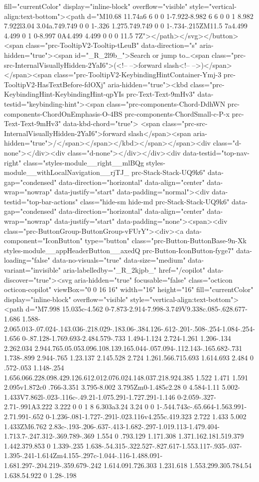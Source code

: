 {{fill="currentColor" display="inline-block" overflow="visible" style="vertical-align:text-bottom"><path d="M10.68 11.74a6 6 0 0 1-7.922-8.982 6 6 0 0 1 8.982 7.922l3.04 3.04a.749.749 0 0 1-.326 1.275.749.749 0 0 1-.734-.215ZM11.5 7a4.499 4.499 0 1 0-8.997 0A4.499 4.499 0 0 0 11.5 7Z"></path></svg></button><span class="prc-TooltipV2-Tooltip-tLeuB" data-direction="s" aria-hidden="true"><span id="_R_2l9b_">Search or jump to…<span class="prc-src-InternalVisuallyHidden-2YaI6">(<!-- -->forward slash<!-- -->)</span></span><span class="prc-TooltipV2-KeybindingHintContainer-Ymj-3 prc-TooltipV2-HasTextBefore-fdOXj" aria-hidden="true"><kbd class="prc-KeybindingHint-KeybindingHint-qpYIs prc-Text-Text-9mHv3" data-testid="keybinding-hint"><span class="prc-components-Chord-DdhWN prc-components-ChordOnEmphasis-O-4BS prc-components-ChordSmall-c-P-x prc-Text-Text-9mHv3" data-kbd-chord="true"> <span class="prc-src-InternalVisuallyHidden-2YaI6">forward slash</span><span aria-hidden="true">/</span></span></kbd></span></span><div class="d-none"></div><div class="d-none"></div></div><div data-testid="top-nav-right" class="styles-module__right__mlBQg styles-module__withLocalNavigation__rjTJ_ prc-Stack-Stack-UQ9k6" data-gap="condensed" data-direction="horizontal" data-align="center" data-wrap="nowrap" data-justify="start" data-padding="normal"><div data-testid="top-bar-actions" class="hide-sm hide-md prc-Stack-Stack-UQ9k6" data-gap="condensed" data-direction="horizontal" data-align="center" data-wrap="nowrap" data-justify="start" data-padding="none"><span><div class="prc-ButtonGroup-ButtonGroup-vFUrY"><div><a data-component="IconButton" type="button" class="prc-Button-ButtonBase-9n-Xk styles-module__appHeaderButton__axedQ prc-Button-IconButton-fyge7" data-loading="false" data-no-visuals="true" data-size="medium" data-variant="invisible" aria-labelledby="_R_2kjpb_" href="/copilot" data-discover="true"><svg aria-hidden="true" focusable="false" class="octicon octicon-copilot" viewBox="0 0 16 16" width="16" height="16" fill="currentColor" display="inline-block" overflow="visible" style="vertical-align:text-bottom"><path d="M7.998 15.035c-4.562 0-7.873-2.914-7.998-3.749V9.338c.085-.628.677-1.686 1.588-2.065.013-.07.024-.143.036-.218.029-.183.06-.384.126-.612-.201-.508-.254-1.084-.254-1.656 0-.87.128-1.769.693-2.484.579-.733 1.494-1.124 2.724-1.261 1.206-.134 2.262.034 2.944.765.05.053.096.108.139.165.044-.057.094-.112.143-.165.682-.731 1.738-.899 2.944-.765 1.23.137 2.145.528 2.724 1.261.566.715.693 1.614.693 2.484 0 .572-.053 1.148-.254 1.656.066.228.098.429.126.612.012.076.024.148.037.218.924.385 1.522 1.471 1.591 2.095v1.872c0 .766-3.351 3.795-8.002 3.795Zm0-1.485c2.28 0 4.584-1.11 5.002-1.433V7.862l-.023-.116c-.49.21-1.075.291-1.727.291-1.146 0-2.059-.327-2.71-.991A3.222 3.222 0 0 1 8 6.303a3.24 3.24 0 0 1-.544.743c-.65.664-1.563.991-2.71.991-.652 0-1.236-.081-1.727-.291l-.023.116v4.255c.419.323 2.722 1.433 5.002 1.433ZM6.762 2.83c-.193-.206-.637-.413-1.682-.297-1.019.113-1.479.404-1.713.7-.247.312-.369.789-.369 1.554 0 .793.129 1.171.308 1.371.162.181.519.379 1.442.379.853 0 1.339-.235 1.638-.54.315-.322.527-.827.617-1.553.117-.935-.037-1.395-.241-1.614Zm4.155-.297c-1.044-.116-1.488.091-1.681.297-.204.219-.359.679-.242 1.614.091.726.303 1.231.618 1.553.299.305.784.54 1.638.54.922 0 1.28-.198 }}
